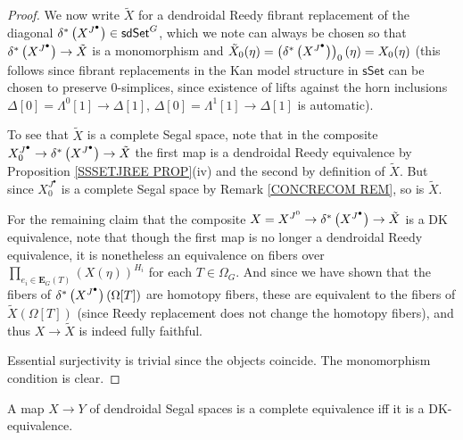 \documentclass[a4paper,10pt
,draft
]{article}%
\begin{document}
\begin{proof}
We now write $\tilde{X}$ for a dendroidal Reedy fibrant replacement of the diagonal 
$\delta^{\**} \left(X^{J^{\bullet}}\right) \in \mathsf{sdSet}^G$,
which we note can always be chosen so that
$\delta^{\**} \left(X^{J^{\bullet}}\right) \to \tilde{X}$
is a monomorphism and
$\tilde{X}_0(\eta) = 
\left(\delta^{\**} \left(X^{J^{\bullet}}\right)\right)_0(\eta)=
X_0(\eta)$ (this follows since fibrant replacements in the Kan model structure in $\mathsf{sSet}$ can be chosen to preserve $0$-simplices, since existence of lifts against the horn inclusions
$\Delta[0]=\Lambda^0[1]\to \Delta[1]$,
$\Delta[0]=\Lambda^1[1]\to \Delta[1]$
is automatic).

To see that $\tilde{X}$ is a complete Segal space, note that in the composite
$X_0^{J^{\bullet}} \to
\delta^{\**}\left( X^{J^{\bullet}} \right)
\to \tilde{X}$
the first map is a dendroidal Reedy equivalence by Proposition \ref{SSSETJREE PROP}(iv) and the second by definition of $\tilde{X}$.
But since $X_0^{J^{\bullet}}$ is a complete Segal space by Remark \ref{CONCRECOM REM}, so is $\tilde{X}$.

For the remaining claim that the composite
$X = X^{J^{0}} \to 
\delta^{\**}\left( X^{J^{\bullet}} \right)
\to \tilde{X}$
is a DK equivalence, 
note that though
the first map is no longer a dendroidal Reedy equivalence, 
it is nonetheless an equivalence
on fibers over
$\prod_{e_i \in \boldsymbol{E}_G(T)} \left(X(\eta)\right)^{H_i}$
for each $T\in \Omega_G$.
And since we have shown that the fibers of
$\delta^{\**}\left( X^{J^{\bullet}} \right)(\Omega[T])$
 are homotopy fibers, these are equivalent to the fibers of $\tilde{X}(\Omega[T])$ (since Reedy replacement does not change the homotopy fibers), 
and thus $X \to \tilde{X}$ is indeed fully faithful.

Essential surjectivity is trivial since the objects coincide.
The monomorphism condition is clear.
\end{proof}


\begin{theorem}\label{COMPIFFDK THM}
	A map $X \to Y$ of dendroidal Segal spaces is a complete equivalence iff it is a DK-equivalence.
\end{theorem}
\end{document}
